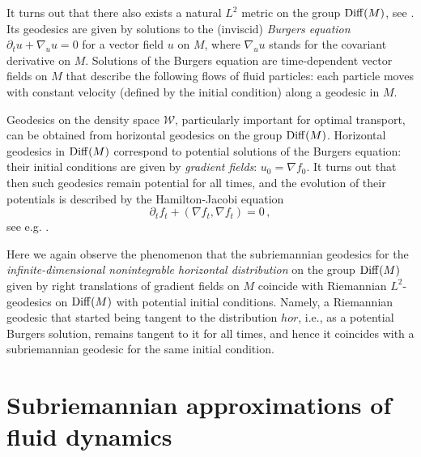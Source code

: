 \documentclass[11pt]{article}
\theoremstyle{definition}
\newcommand{\grad}[1]{\nabla #1}
\newcounter{ai}
\begin{document}
\medskip

It turns out that there also exists a natural $L^2$ metric on the group ${\rm Diff}(M)$, see \cite{otto2001geometry}. 
Its geodesics are given by solutions to the (inviscid) {\it Burgers equation} $\partial_t u+\nabla_u u=0$
for a vector field $u$ on $M$, where $\nabla_u u$ stands for the covariant derivative on $M$. Solutions of the Burgers equation are time-dependent vector fields on $M$
that describe the following flows of fluid particles: 
each particle moves with constant velocity (defined by the initial condition) 
along a geodesic in $M$.


Geodesics on the density space $\mathcal{W}$, particularly important for optimal transport,  can be obtained from horizontal geodesics on the group ${\rm Diff}(M)$. Horizontal geodesics in  ${\rm Diff}(M)$ correspond to potential solutions of the Burgers equation: their initial conditions are given by {\it gradient fields}: 
$u_0=\grad f_0$. It turns out that then such geodesics remain potential for all times, and the evolution of their potentials is described by the Hamilton-Jacobi equation 
$$
\partial_t f_t+ (\nabla f_t, \nabla f_t)=0\,,
$$ 
see e.g. 
\cite{otto2001geometry, khesin2021geometric}.
\medskip

Here we again observe the phenomenon that the subriemannian geodesics  for the {\it infinite-dimensional nonintegrable horizontal distribution} on the group ${\rm Diff}(M)$ given by right translations of gradient fields on $M$
coincide with Riemannian $L^2$-geodesics  on ${\rm Diff}(M)$ with potential initial conditions. Namely, a Riemannian geodesic that started being tangent to the distribution $hor$, i.e., as a potential Burgers solution,
remains tangent to it for all times, and hence it coincides with a subriemannian geodesic for the same initial condition.

\medskip


\section{Subriemannian approximations of fluid dynamics}
\label{sec:fluidapprox}
\end{document}
